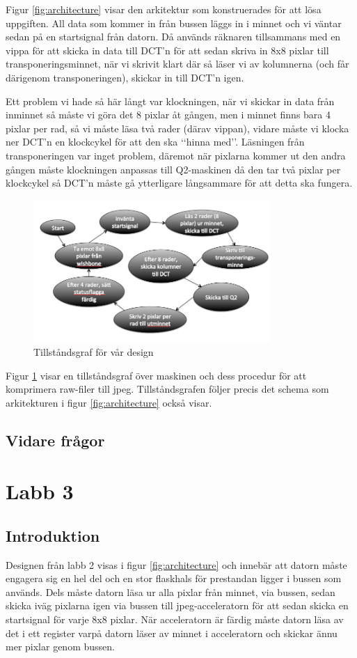 \documentclass[a4paper]{article}
\begin{document}
Figur \ref{fig:architecture} visar den arkitektur som konstruerades för att lösa uppgiften. All data som kommer in från bussen läggs in i minnet och vi väntar sedan på en startsignal från datorn. Då används räknaren tillsammans med en vippa för att skicka in data till DCT\rq{}n för att sedan skriva in 8x8 pixlar till transponeringsminnet, när vi skrivit klart där så läser vi av kolumnerna (och får därigenom transponeringen), skickar in till DCT\rq{}n igen.

Ett problem vi hade så här långt var klockningen, när vi skickar in data från inminnet så måste vi göra det 8 pixlar åt gången, men i minnet finns bara 4 pixlar per rad, så vi måste läsa två rader (därav vippan), vidare måste vi klocka ner DCT\rq{}n en klockcykel för att den ska \lq\lq{}hinna med\rq\rq{}. Läsningen från transponeringen var inget problem, däremot när pixlarna kommer ut den andra gången måste klockningen anpassas till Q2-maskinen då den tar två pixlar per klockcykel så DCT\rq{}n måste gå ytterligare långsammare för att detta ska fungera.

\begin{figure}[h]
\centering
\includegraphics[width=340px]{states.png}
\caption{Tillståndsgraf för vår design}
\label{fig:state}
\end{figure}
Figur \ref{fig:state} visar en tillståndsgraf över maskinen och dess procedur för att komprimera raw-filer till jpeg. Tillståndsgrafen följer precis det schema som arkitekturen i figur \ref{fig:architecture} också visar.

\subsection{Vidare frågor}


\section{Labb 3}
\subsection{Introduktion}
Designen från labb 2 visas i figur \ref{fig:architecture} och innebär att datorn måste engagera sig en hel del och en stor flaskhals för prestandan ligger i bussen som används. Dels måste datorn läsa ur alla pixlar från minnet, via bussen, sedan skicka iväg pixlarna igen via bussen till jpeg-acceleratorn för att sedan skicka en startsignal för varje 8x8 pixlar. När acceleratorn är färdig måste datorn läsa av det i ett register varpå datorn läser av minnet i acceleratorn och skickar ännu mer pixlar genom bussen. 
\end{document}
